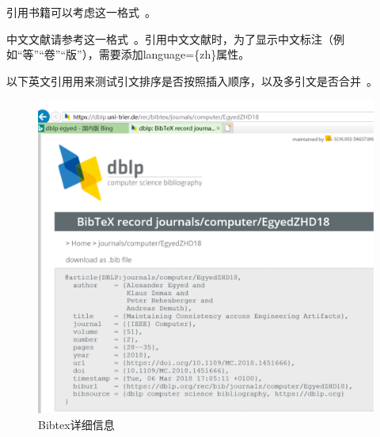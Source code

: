 引用书籍可以考虑这一格式~\cite{Pohl2010Requirements}。

中文文献请参考这一格式~\cite{gmy2022}。引用中文文献时，为了显示中文标注（例如“等”“卷”“版”），需要添加language=\{zh\}属性。

以下英文引用用来测试引文排序是否按照插入顺序，以及多引文是否合并~\cite{DBLP:journals/computer/EgyedZHD18, DBLP:journals/ml/TingZCZWZ19}。

\begin{figure}[htb]
  \centering
  \includegraphics[width=5in]{figure/chapter7/bibtexDetail.pdf}
  \caption{Bibtex详细信息}
  \label{fig:bibtexDetailCH7}
\end{figure}
